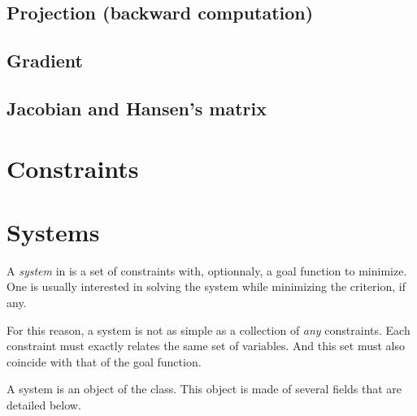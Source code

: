 \subsection{Projection (backward computation)}

	
\subsection{Gradient}

\subsection{Jacobian and Hansen's matrix}

\section{Constraints}

\section{Systems}

A {\it system} in \ibex is a set of constraints with, optionnaly, a goal function to minimize.
One is usually interested in solving the system while minimizing the criterion, if any.

For this reason, a system is not as simple as a collection of {\it any} constraints.
Each constraint must exactly relates the same set of variables. And this set must
also coincide with that of the goal function.

A system is an object of the  class. This object is made of several fields
that are detailed below. %


